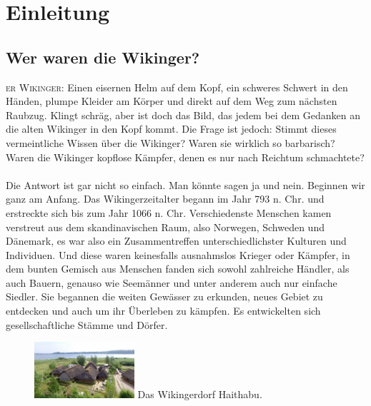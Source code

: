 \documentclass[12pt,a4paper,ngerman,openany]{book}
\newcommand{\flettrine}[2]{\lettrine[lines=2, depth=0, loversize=0.25, nindent=0.69pt, lraise=0.15]{\initfamily{#1}}{#2}}
\newcommand*\initfamily{\usefont{U}{GotIn}{xl}{n}}
\newcommand\blankpage{\null \thispagestyle{empty} \addtocounter{page}{-1} \newpage}
\newcommand{\fchapter}[1]{\chapter{#1}\thispagestyle{chapterstyle}}
\begin{document}

\thispagestyle{empty}
\newpage

\afterpage{\blankpage}
\tableofcontents
\thispagestyle{empty}


\fchapter{Einleitung}

\section{Wer waren die Wikinger?}

\flettrine{D}{er Wikinger:} Einen eisernen Helm auf dem Kopf, ein schweres Schwert in den Händen, plumpe Kleider am Körper und direkt auf dem Weg zum nächsten Raubzug.
Klingt schräg, aber ist doch das Bild, das jedem bei dem Gedanken an die alten Wikinger in den Kopf kommt. Die Frage ist jedoch: Stimmt dieses vermeintliche Wissen über die Wikinger?
Waren sie wirklich so barbarisch? Waren die Wikinger kopflose Kämpfer, denen es nur nach Reichtum schmachtete?\\\\
Die Antwort ist gar nicht so einfach. Man könnte sagen ja und nein. Beginnen wir ganz am Anfang. Das Wikingerzeitalter begann im Jahr 793 n. Chr. und erstreckte sich bis zum Jahr 1066 n. Chr.
Verschiedenste Menschen kamen verstreut aus dem skandinavischen Raum, also Norwegen, Schweden und Dänemark, es war also ein Zusammentreffen unterschiedlichster Kulturen und Individuen.
Und diese waren keinesfalls ausnahmslos Krieger oder Kämpfer, in dem bunten Gemisch aus Menschen fanden sich sowohl zahlreiche Händler, als auch Bauern, genauso wie Seemänner und unter anderem auch nur einfache Siedler.
Sie begannen die weiten Gewässer zu erkunden, neues Gebiet zu entdecken und auch um ihr Überleben zu kämpfen. Es entwickelten sich gesellschaftliche Stämme und Dörfer.

\begin{figure}
  \centering
  \includegraphics[width=0.33\textwidth]{haithabu.jpg}
  Das Wikingerdorf Haithabu.
\end{figure}
\end{document}
